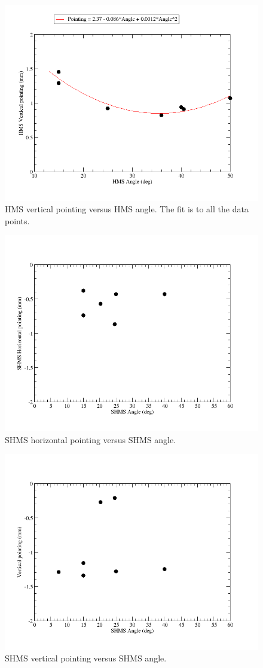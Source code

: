 \documentclass[]{article}
\begin{document}
		\begin{figure}[h]	
			\begin{center}
				\includegraphics[width=0.8\columnwidth]{hms_vertical_pointing.png}
			\end{center}
			\caption{HMS vertical pointing versus HMS angle. The fit is to all the data points. }
			\label{fig:hms_vert_pointing}
		\end{figure}
		
		\begin{figure}[h]	
			\begin{center}
				\includegraphics[width=0.8\columnwidth]{shms_horizontal_pointing.png}
			\end{center}
			\caption{SHMS horizontal pointing versus SHMS angle.  }
			\label{fig:shms_horz_pointing}
		\end{figure}
		
		\begin{figure}[h]	
			\begin{center}
				\includegraphics[width=0.8\columnwidth]{shms_vertical_pointing.png}
			\end{center}
			\caption{SHMS vertical pointing versus SHMS angle.  }
			\label{fig:shms_vert_pointing}
		\end{figure}
		
		
			
\end{document}
